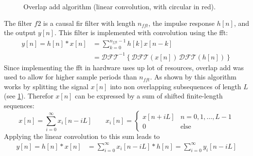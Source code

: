 \documentclass[12pt,a4paper,parskip=full,abstract=true,BCOR=10mm,twoside,open=right]{scrreprt}
\begin{document}
\begin{figure}[htb]
    \caption{Overlap add algorithm (linear convolution, with circular in red). }
    \label{fig:overlap_add}
\end{figure}
The filter $f2$ is a causal \gls{fir} filter with length $n_{fft}$, the impulse response $h[n]$, and the output $y[n]$. This filter is
implemented with convolution using the \gls{fft}:
\begin{equation}
    \begin{split}
     \label{eq:circ} y[n] = h[n] * x[n] & = \sum_{k=0}^{n_{fft}-1} h[k]x[n-k]\\
         & = \mathcal{DFT}^{-1}\left\{\mathcal{DFT}(x[n])\,\mathcal{DFT}(h[n])\right\}
    \end{split}
\end{equation}
Since implementing the \gls{fft} in hardware uses up lot of resources, overlap add
was used to allow for higher sample periods than $n_{fft}$. As shown by \cite{schaums_2011}
this algorithm works by splitting the signal $x[n]$ into non overlapping
subsequences of length $L$ (see \cref{fig:overlap_add}). Therefor $x[n]$ can
be expressed by a sum of shifted finite-length sequences:
\begin{equation}
    \label{eq:sum_seq} x[n] = \sum_{i=0}^{\infty} x_i[n-iL] \qquad x_i[n] =\begin{cases}
        x[n+iL] & n = 0, 1, \ldots, L-1\\
        0 & \text{else} \end{cases}
\end{equation}
Applying the linear convolution to this sum leads to
\begin{equation}
    \begin{split}\label{eq:overlap_add_sum}
        y[n] = h[n] * x[n] & = \sum_{i=0}^{\infty} x_i[n-iL] * h[n] = \sum_{i=0}^{\infty} y_i[n-iL]
    \end{split}
\end{equation}
\end{document}
